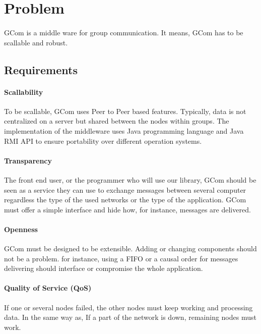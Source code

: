 \section{Problem}

\paragraph{}{
	GCom is a middle ware for group communication. It means,
 GCom has to be scallable and robust.
}

\subsection{Requirements}

\paragraph{Scallability}{
	To be scallable, GCom uses Peer to Peer based features.
 Typically, data is not centralized on a server but shared 
 between the nodes within groups. The implementation of the
 middleware uses Java programming language and Java RMI API to
 ensure portability over different operation systems.
}

\paragraph{Transparency}{
	The front end user, or the programmer who will use our
 library, GCom should be seen as a service they can use to
 exchange messages between several computer regardless the
 type of the used networks or the type of the application.
 GCom must offer a simple interface and hide how, for
 instance, messages are delivered.
}

\paragraph{Openness}{
	GCom must be designed to be extensible. Adding or changing 
 components should not be a problem. for instance, using a FIFO
 or a causal order for messages delivering should interface or
 compromise the whole application.
}

\paragraph{Quality of Service (QoS)}{
	If one or several nodes failed, the other nodes must keep
 working and processing data. In the same way as, If a part of
 the network is down, remaining nodes must work.
}

